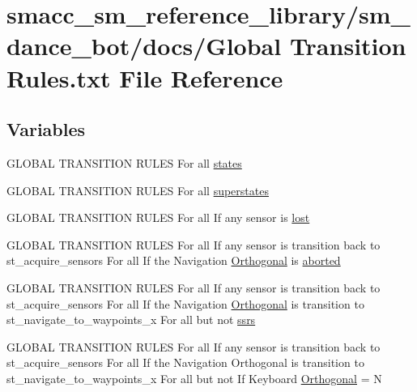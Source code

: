 \hypertarget{docs_2Global_01Transition_01Rules_8txt}{}\section{smacc\+\_\+sm\+\_\+reference\+\_\+library/sm\+\_\+dance\+\_\+bot/docs/\+Global Transition Rules.\+txt File Reference}
\label{docs_2Global_01Transition_01Rules_8txt}
\subsection*{Variables}
\begin{DoxyCompactItemize}
\item 
G\+L\+O\+B\+AL T\+R\+A\+N\+S\+I\+T\+I\+ON R\+U\+L\+ES For all \hyperlink{docs_2Global_01Transition_01Rules_8txt_a54d1602740c77675ed14ebfe688f4374}{states}
\item 
G\+L\+O\+B\+AL T\+R\+A\+N\+S\+I\+T\+I\+ON R\+U\+L\+ES For all \hyperlink{docs_2Global_01Transition_01Rules_8txt_af31ae27f561335eed0d5161d8ee256f8}{superstates}
\item 
G\+L\+O\+B\+AL T\+R\+A\+N\+S\+I\+T\+I\+ON R\+U\+L\+ES For all If any sensor is \hyperlink{docs_2Global_01Transition_01Rules_8txt_a21166d43cc40d1ae31189d3fe91d8346}{lost}
\item 
G\+L\+O\+B\+AL T\+R\+A\+N\+S\+I\+T\+I\+ON R\+U\+L\+ES For all If any sensor is transition back to st\+\_\+acquire\+\_\+sensors For all If the Navigation \hyperlink{3_2docs_2Global_01Transition_01Rules_8txt_a2e1cdec29dad5013e514270d0a78fe22}{Orthogonal} is \hyperlink{docs_2Global_01Transition_01Rules_8txt_a682ac6cc3cf2eeec69ad3f310ae363ea}{aborted}
\item 
G\+L\+O\+B\+AL T\+R\+A\+N\+S\+I\+T\+I\+ON R\+U\+L\+ES For all If any sensor is transition back to st\+\_\+acquire\+\_\+sensors For all If the Navigation \hyperlink{3_2docs_2Global_01Transition_01Rules_8txt_a2e1cdec29dad5013e514270d0a78fe22}{Orthogonal} is transition to st\+\_\+navigate\+\_\+to\+\_\+waypoints\+\_\+x For all but not \hyperlink{docs_2Global_01Transition_01Rules_8txt_aa881c6a22397113c3342bf4c44212934}{ssrs}
\item 
G\+L\+O\+B\+AL T\+R\+A\+N\+S\+I\+T\+I\+ON R\+U\+L\+ES For all If any sensor is transition back to st\+\_\+acquire\+\_\+sensors For all If the Navigation Orthogonal is transition to st\+\_\+navigate\+\_\+to\+\_\+waypoints\+\_\+x For all but not If Keyboard \hyperlink{docs_2Global_01Transition_01Rules_8txt_a2e1cdec29dad5013e514270d0a78fe22}{Orthogonal} = N

\end{DoxyCompactItemize}

